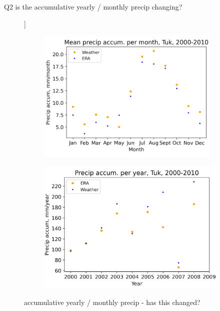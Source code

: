 \documentclass[draft]{agujournal2019}
\begin{document}
Q2 is the accumulative yearly / monthly precip changing?


\begin{figure}[h!tbp]]
\centering
\begin{subfigure}[b]{0.55\textwidth}
   \includegraphics[width=1\linewidth]{figures/precip_accum_per_month_tuk_00_10.png}
   \caption{}
   \label{fig:Ng1} 
\end{subfigure}

\begin{subfigure}[b]{0.55\textwidth}
   \includegraphics[width=1\linewidth]{figures/precip_accum_per_year_tuk_20_10.png}
   \caption{}
   \label{fig:Ng2}
\end{subfigure}

\caption{accumulative yearly / monthly precip - has this changed? }
\end{figure}
\end{document}
